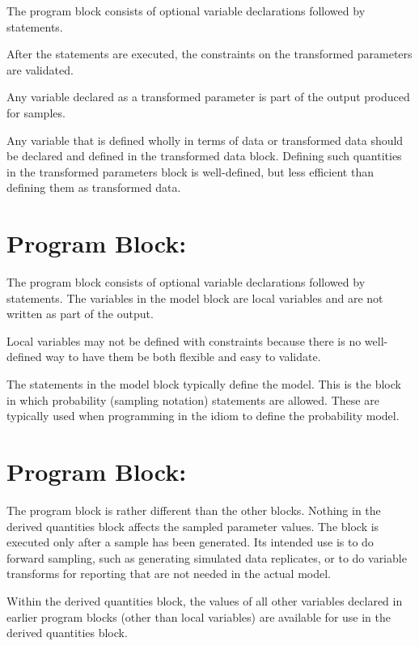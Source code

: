 The  program block consists of optional
variable declarations followed by statements.  

After the statements are executed, the constraints on the 
transformed parameters are validated. 

Any variable declared as a transformed parameter is part of the output
produced for samples.

Any variable that is defined wholly in terms of data or transformed
data should be declared and defined in the transformed data block.
Defining such quantities in the transformed parameters block is
well-defined, but less efficient than defining them as transformed
data.

\section{Program Block: }

The  program block consists of optional variable
declarations followed by statements.  The variables in the model block
are local variables and are not written as part of the output.  

Local variables may not be defined with constraints because there is
no well-defined way to have them be both flexible and easy to
validate.

The statements in the model block typically define the model.  This is
the block in which probability (sampling notation) statements are
allowed.  These are typically used when programming in the \BUGS idiom
to define the probability model.  


\section{Program Block: }

The  program block is rather different than
the other blocks.  Nothing in the derived quantities block affects the
sampled parameter values.  The block is executed only after a sample
has been generated.  Its intended use is to do forward sampling, such
as generating simulated data replicates, or to do variable transforms
for reporting that are not needed in the actual model.

Within the derived quantities block, the values of all other variables
declared in earlier program blocks (other than local variables) are
available for use in the derived quantities block.

